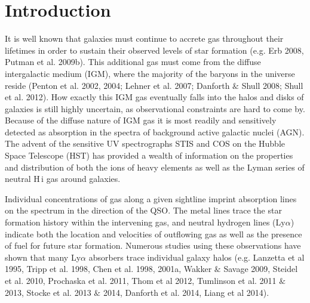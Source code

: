 \documentclass[iop]{emulateapj-rtx4}
\begin{document}


%


\section{Introduction}

It is well known that galaxies must continue to accrete gas throughout their lifetimes in order to sustain their observed levels of star formation (e.g. Erb 2008, Putman et al. 2009b). This additional gas must come from the diffuse intergalactic medium (IGM), where the majority of the baryons in the universe reside (Penton et al. 2002, 2004; Lehner et al. 2007; Danforth $\&$ Shull 2008; Shull et al. 2012). How exactly this IGM gas eventually falls into the halos and disks of galaxies is still highly uncertain, as observational constraints are hard to come by. Because of the diffuse nature of IGM gas it is most readily and sensitively detected as absorption in the spectra of background active galactic nuclei (AGN). The advent of the sensitive UV spectrographs STIS and COS on the Hubble Space Telescope (HST) has provided a wealth of information on the properties and distribution of both the ions of heavy elements as well as the Lyman series of neutral H\,{\sc i} gas around galaxies. 

Individual concentrations of gas along a given sightline imprint absorption lines on the spectrum in the direction of the QSO. The metal lines trace the star formation history within the intervening gas, and neutral hydrogen lines (Ly$\alpha$) indicate both the location and velocities of outflowing gas as well as the presence of fuel for future star formation. Numerous studies using these observations have shown that many Ly$\alpha$ absorbers trace individual galaxy halos (e.g. Lanzetta et al 1995, Tripp et al. 1998, Chen et al. 1998, 2001a, Wakker $\&$ Savage 2009, Steidel et al. 2010, Prochaska et al. 2011, Thom et al 2012, Tumlinson et al. 2011 $\&$ 2013, Stocke et al. 2013 $\&$ 2014, Danforth et al. 2014, Liang et al 2014).
\end{document}
